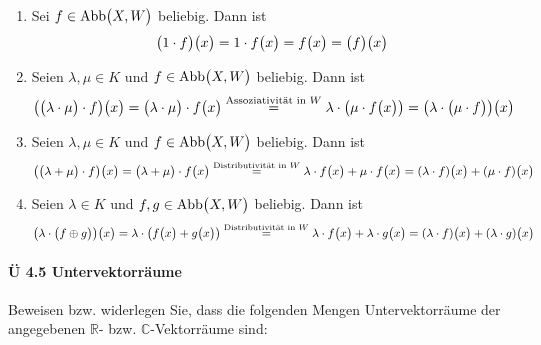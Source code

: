 \documentclass{scrreprt}
\begin{document}
\begin{enumerate}[(V1)]
\item Sei $f \in \text{Abb}\qty\big(X, W)$ beliebig.
  Dann ist
  \[
    \qty\big(1 \cdot f)\qty\big(x) = 1 \cdot f\qty\big(x) = f\qty\big(x)
    = \qty\big(f)\qty\big(x)
  \]

\item Seien $\lambda, \mu \in K$ und $f \in \text{Abb}\qty\big(X, W)$ beliebig.
  Dann ist
  \[
    \qty(\qty\big(\lambda \cdot \mu) \cdot f)\qty\big(x) =
    \qty\big(\lambda \cdot \mu) \cdot f\qty\big(x)
    \overset{\text{Assoziativität in $W$}}=
    \lambda \cdot \qty\big(\mu \cdot f\qty\big(x))
    = \qty(\lambda \cdot \qty\big(\mu \cdot f))\qty\big(x)
  \]

\item Seien $\lambda, \mu \in K$ und $f \in \text{Abb}\qty\big(X, W)$ beliebig.
  Dann ist
  \[
    \qty(\qty\big(\lambda + \mu) \cdot f)\qty\big(x) =
    \qty\big(\lambda + \mu) \cdot f\qty\big(x)
    \overset{\text{Distributivität in $W$}}=
    \lambda \cdot f\qty\big(x) + \mu \cdot f\qty\big(x)
    = \qty(\lambda \cdot f)\qty\big(x) + \qty(\mu \cdot f)\qty\big(x)
  \]

\item Seien $\lambda \in K$ und $f, g \in \text{Abb}\qty\big(X, W)$ beliebig.
  Dann ist
  \[
    \qty(\lambda \cdot \qty\big(f \oplus g))\qty\big(x) =
    \lambda \cdot \qty(f\qty\big(x) + g\qty\big(x))
    \overset{\text{Distributivität in $W$}}=
    \lambda \cdot f\qty\big(x) + \lambda \cdot g\qty\big(x)
    = \qty(\lambda \cdot f)\qty\big(x) + \qty(\lambda \cdot g)\qty\big(x)
  \]
\end{enumerate}

\paragraph{Ü 4.5 Untervektorräume}
Beweisen bzw. widerlegen Sie, dass die folgenden Mengen Untervektorräume der
angegebenen $\mathbb{R}$- bzw. $\mathbb{C}$-Vektorräume sind:
\end{document}
